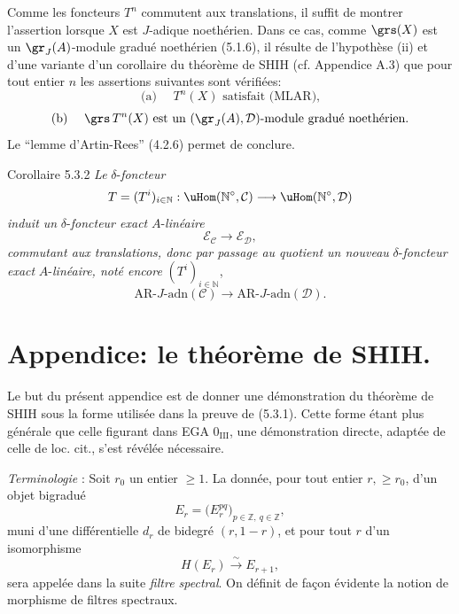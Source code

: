\begin{prooftext}[Preuve]
Comme les foncteurs \(T^n\) commutent aux translations, il suffit de montrer l'assertion lorsque \(X\) est \(J\)-adique noethérien. Dans ce cas, comme \(\grs(X)\) est un \(\gr_J(A)\)-module gradué noethérien (5.1.6), il résulte de l'hypothèse (ii) et d'une variante d'un corollaire du théorème de SHIH (cf. Appendice A.3) que pour tout entier \(n\) les assertions suivantes sont vérifiées:
\[
\text{(a) }\quad T^n(X)\text{ satisfait (MLAR),}
\]
\[
\text{(b) }\quad \grs\,T^n(X)\text{ est un }(\gr_J(A),\mathcal{D})\text{-module gradué noethérien.}
\]
Le ``lemme d'Artin-Rees'' (4.2.6) permet de conclure.
\end{prooftext}

\begin{statement}{Corollaire 5.3.2}
\emph{Le} \(\delta\)-\emph{foncteur}
\[
T=(T^i)_{i\in\mathbb{N}}:\uHom(\mathbb{N}^\circ,\mathcal{C})\longrightarrow\uHom(\mathbb{N}^\circ,\mathcal{D})
\]
\emph{induit un} \(\delta\)-\emph{foncteur exact} \(A\)-\emph{linéaire}
\[
\mathcal{E}_{\mathcal{C}}\longrightarrow\mathcal{E}_{\mathcal{D}},
\]
\emph{commutant aux translations, donc par passage au quotient un nouveau} \(\delta\)-\emph{foncteur exact} \(A\)-\emph{linéaire, noté encore} \((T^i)_{i\in\mathbb{N}}\),
\[
\mathrm{AR}\text{-}J\text{-adn}(\mathcal{C})\longrightarrow
\mathrm{AR}\text{-}J\text{-adn}(\mathcal{D}).
\]
\end{statement}

\section*{Appendice: le théorème de SHIH.}

Le but du présent appendice est de donner une démonstration du théorème de SHIH sous la forme utilisée dans la preuve de (5.3.1). Cette forme étant plus générale que celle figurant dans EGA \(0_{\mathrm{III}}\), une démonstration directe, adaptée de celle de loc. cit., s'est révélée nécessaire.

\emph{Terminologie} : Soit \(r_0\) un entier \(\ge1\). La donnée, pour tout entier \(r,\ge r_0\), d'un objet bigradué
\[
E_r=\bigl(E_r^{pq}\bigr)_{p\in\mathbb{Z},\ q\in\mathbb{Z}},
\]
muni d'une différentielle \(d_r\) de bidegré \((r,1-r)\), et pour tout \(r\) d'un isomorphisme
\[
H(E_r)\xrightarrow{\sim}E_{r+1},
\]
sera appelée dans la suite \emph{filtre spectral}. On définit de façon évidente la notion de morphisme de filtres spectraux.

